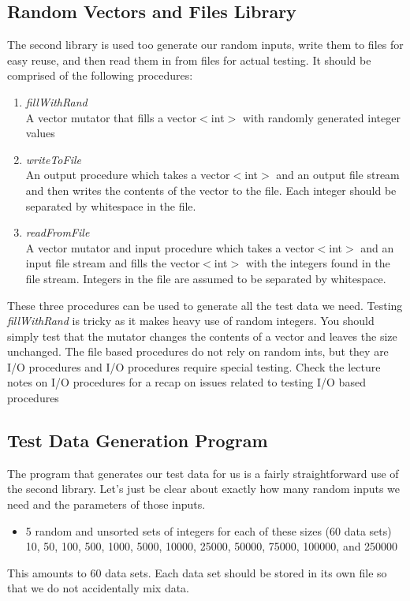 \documentclass[]{tufte-handout}
\begin{document}
\subsection{Random Vectors and Files Library}
The second library is used too generate our random inputs, write them to files for easy reuse, and then read them in from files for actual testing.  It should be comprised of the following procedures:
\begin{enumerate}
\item \textit{fillWithRand} \\
A vector mutator that fills a vector$<$int$>$ with randomly generated integer values
\item \textit{writeToFile} \\ 
An output procedure which takes a vector$<$int$>$ and an output file stream and then writes the contents of the vector to the file. Each integer should be separated by whitespace in the file.
\item \textit{readFromFile} \\
A vector mutator and input procedure which takes a vector$<$int$>$ and an input file stream and fills the vector$<$int$>$ with the integers found in the file stream. Integers in the file are assumed to be separated by whitespace.
\end{enumerate}
These three procedures can be used to generate all the test data we need. Testing \textit{fillWithRand} is tricky as it makes heavy use of random integers. You should simply test that the mutator changes the contents of a vector and leaves the size unchanged.  The file based procedures do not rely on random ints, but they are I/O procedures and I/O procedures require special testing. Check the lecture notes on I/O procedures for a recap on issues related to testing I/O based procedures

\subsection{Test Data Generation Program}

The program that generates our test data for us is a fairly straightforward use of the second library. Let's just be clear about exactly how many random inputs we need and the parameters of those inputs.
\begin{itemize}
\item 5 random and unsorted sets of integers for each of these sizes (60 data sets) \\
10, 50, 100, 500, 1000, 5000, 10000, 25000, 50000, 75000, 100000, and 250000
\end{itemize} 
This amounts to 60 data sets.  Each data set should be stored in its own file so that we do not accidentally mix data.
\end{document}
